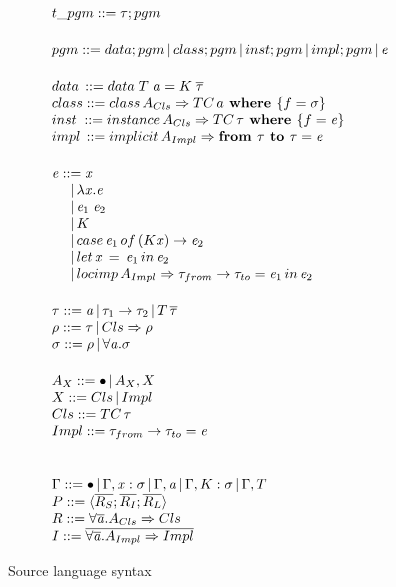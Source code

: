 \documentclass{article}
\begin{document}
\begin{figure}
  \[
\begin{array}{@{\hspace{0mm}}l@{\hspace{0mm}}}  
  t\_pgm ::= \type;pgm\\[5mm]
  pgm ::= data;pgm\,|\,class;pgm\,|\,inst;pgm\,|\,impl;pgm\,|\,\term
  \\[5mm]
 data\,::= data\;T\;\tyVar=K\;\overline{\type}\\
 class ::=class\,A_{Cls}\Rightarrow TC\,a\textbf{ where }\{f=\typeS\}\\
 inst\;::=instance\,A_{Cls}\Rightarrow TC \,\type\textbf{ where }\{f=\term\}\\
 impl\,::=implicit\,A_{Impl} \Rightarrow \textbf{from }\type\textbf{ to }\type = \term
  \\[5mm]

  \term ::= \tmVar\\
  \phantom{\term ::}|\,\lambda \tmVar.\term\\
  \phantom{\term ::}|\,\term_1 \; \term_2\\
  \phantom{\term ::}|\, K\\
  \phantom{\term ::}|\, case \, \term_1 \, of\, (K \tmVar) \rightarrow \term_2\\
  \phantom{\term ::}|\, let \, \tmVar \, =\, \term_1 \,in\, \term_2  \\
  \phantom{\term ::}|\, \iLocal{A_{Impl}}{\type_{from}}{\type_{to}}{\term_1}{\term_2}
  \\[5mm]
  \type ::= \tyVar\,|\,\type_1\to\type_2\,|\,T\,\overline{\type}\\
  \qtype ::= \type\,|\,Cls \Rightarrow \qtype\\
  \typeS ::= \qtype\,|\,\forall\tyVar.\typeS
  \\[5mm]
  A_X ::= \bullet\,|\,A_X,X\\
  X ::= Cls\,|\,Impl\\
  Cls ::= TC\,\type\\
  Impl ::= \type_{from}\to\type_{to}=\term\\
  \\[5mm]
  \tyEnv::=\bullet\,|\,\tyEnv,\tmVar:\typeS\,|\,\tyEnv,\tyVar\,|\,\tyEnv,K:\typeS\,|\,\tyEnv,T\\
  \thEnv::=\langle \overline{R_S};\overline{R_I};\overline{R_L} \rangle\\
  R ::= \forall\overline{\tyVar}.A_{Cls}\Rightarrow Cls\\
  \imEnv::=\overline{\forall \overline{\tyVar}.A_{Impl}\Rightarrow Impl}
  \end{array}
\]
  \caption{Source language syntax}
\end{figure}
\end{document}
